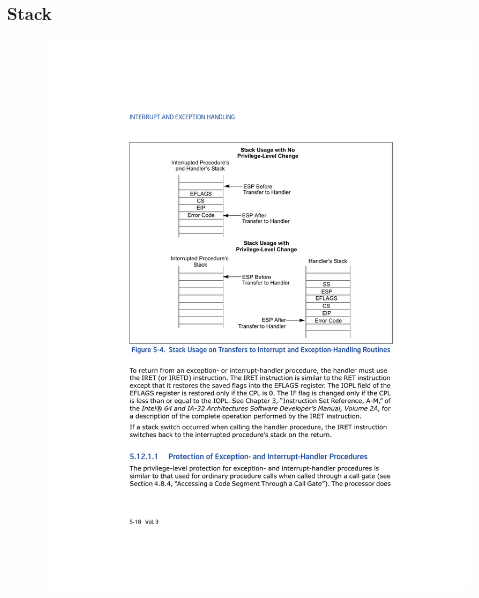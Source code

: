 \documentclass[aspectratio=169]{beamer}
\begin{document}
\begin{frame}
    \frametitle{Stack}
    \vspace{-0.6cm}
    \begin{figure}
    \centering
    \includegraphics[scale=0.72]{img/stack}
    \end{figure}
\end{frame}
\end{document}
